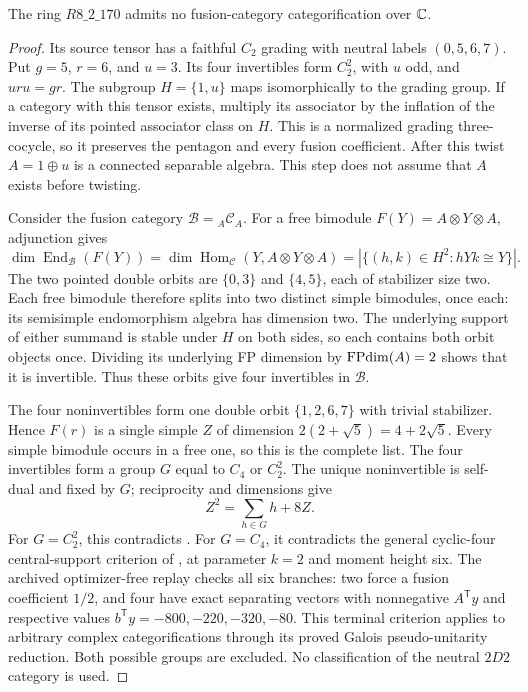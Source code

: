 \begin{proposition}\label{prop:r170-morita}
The ring $R8\_2\_170$ admits no fusion-category categorification
over $\mathbb C$.
\end{proposition}
\begin{proof}
Its source tensor has a faithful $C_2$ grading with neutral
labels $(0,5,6,7)$. Put $g=5$, $r=6$, and $u=3$. Its four
invertibles form $C_2^2$, with $u$ odd, and $uru=gr$.
The subgroup $H=\{1,u\}$ maps isomorphically to the grading
group. If a category with this tensor exists, multiply its
associator by the inflation of the inverse of its pointed
associator class on $H$. This is a normalized grading
three-cocycle, so it preserves the pentagon and every fusion
coefficient. After this twist $A=1\oplus u$ is a connected
separable algebra. This step does not assume that $A$ exists
before twisting.

Consider the fusion category $\mathcal B={}_A\mathcal C_A$.
For a free bimodule $F(Y)=A\otimes Y\otimes A$, adjunction gives
\[
\dim\operatorname{End}_{\mathcal B}(F(Y))
 =\dim\operatorname{Hom}_{\mathcal C}(Y,A\otimes Y\otimes A)
 =|\{(h,k)\in H^2:hYk\cong Y\}|.
\]
The two pointed double orbits are $\{0,3\}$ and $\{4,5\}$,
each of stabilizer size two. Each free bimodule therefore
splits into two distinct simple bimodules, once each: its
semisimple endomorphism algebra has dimension two. The
underlying support of either summand is stable under $H$
on both sides, so each contains both orbit objects once.
Dividing its underlying FP dimension by $\operatorname{FPdim}(A)=2$
shows that it is invertible. Thus these orbits give four
invertibles in $\mathcal B$.

The four noninvertibles form one double orbit
$\{1,2,6,7\}$ with trivial stabilizer. Hence $F(r)$ is a
single simple $Z$ of dimension $2(2+\sqrt5)=4+2\sqrt5$.
Every simple bimodule occurs in a free one, so this is the
complete list. The four invertibles form a group $G$ equal
to $C_4$ or $C_2^2$. The unique noninvertible is self-dual
and fixed by $G$; reciprocity and dimensions give
\[
Z^2=\sum_{h\in G}h+8Z.
\]
For $G=C_2^2$, this contradicts
\cite[Theorem~1.1]{SchNear}. For $G=C_4$, it contradicts
the general cyclic-four central-support criterion of
\cite[Theorem~6.3]{R5}, at parameter $k=2$ and moment
height six. The archived optimizer-free replay checks all
six branches: two force a fusion coefficient $1/2$, and
four have exact separating vectors with nonnegative
$A^{\mathsf T}y$ and respective values
$b^{\mathsf T}y=-800,-220,-320,-80$. This terminal
criterion applies to arbitrary complex categorifications
through its proved Galois pseudo-unitarity reduction.
Both possible groups are excluded. No classification of
the neutral $2D2$ category is used.
\end{proof}

